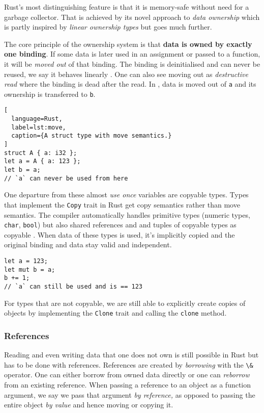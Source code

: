 Rust's most distinguishing feature is that it is memory-safe without
need for a garbage collector. That is achieved by its novel approach to
\emph{data ownership} which is partly inspired by \emph{linear ownership
types} \citep{ownership-types} but goes much further.

The core principle of the ownership system is that \textbf{data is owned
by exactly one binding}. If some data is later used in an assignment or
passed to a function, it will be \emph{moved out} of that binding. The
binding is deinitialised and can never be reused, we say it behaves
linearly \cite{oxide}. One can also see moving out as \emph{destructive
read} \cite{islands-alias-protection} where the binding is dead after the read.
In ,
data is moved out of \passthrough{\lstinline!a!} and its
ownership is transferred to \passthrough{\lstinline!b!}.

\begin{lstlisting}[
  language=Rust,
  label=lst:move,
  caption={A struct type with move semantics.}
]
struct A { a: i32 };
let a = A { a: 123 };
let b = a;
// `a` can never be used from here
\end{lstlisting}

One departure from these almost \emph{use once} \citep{use-once} variables are
copyable types. Types that implement the \passthrough{\lstinline!Copy!} trait in
Rust get copy semantics rather than move semantics. The compiler automatically
handles primitive types (numeric types, \passthrough{\lstinline!char!},
\passthrough{\lstinline!bool!}) but also shared references and and tuples of
copyable types as copyable \cite[section "Special types and traits"]{rustref}.
When data of these types is used, it's implicitly copied and the original
binding and data stay valid and independent.

\begin{lstlisting}
let a = 123;
let mut b = a;
b += 1;
// `a` can still be used and is == 123
\end{lstlisting}

For types that are not copyable, we are still able to explicitly create
copies of objects by implementing the \passthrough{\lstinline!Clone!}
trait and calling the \passthrough{\lstinline!clone!} method.

\subsubsection{References}

Reading and even writing data that one does not own is still possible in
Rust but has to be done with references. References are created by
\emph{borrowing} with the \passthrough{\lstinline!\&!} operator. One can
either borrow from owned data directly or one can \emph{reborrow} from
an existing reference. When passing a reference to an object as a
function argument, we say we pass that argument \emph{by reference,} as
opposed to passing the entire object \emph{by value} and hence moving or
copying it.

